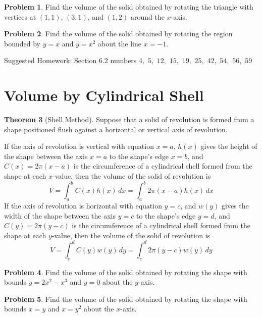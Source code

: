 \documentclass[letterpaper, twoside, 12pt]{book}
\theoremstyle{definition}
\newtheorem{theorem}{Theorem}
\theoremstyle{definition}
\newtheorem{problem}[theorem]{Problem}
\begin{document}
\begin{problem}
 Find the volume of the solid obtained by rotating the triangle with
 vertices at $(1,1)$, $(3,1)$, and $(1,2)$ around the $x$-axis.
\end{problem}

\vfill

\begin{problem}
 Find the volume of the solid obtained by rotating the region bounded by
 $y=x$ and $y=x^2$ about the line $x = -1$.
\end{problem}

\vfill

\noindent Suggested Homework: Section $6.2$ numbers $4,$ $5,$ $12,$ $15,$ $19,$ $25,$ $42,$ $54,$ $56,$ $59$
\newpage

\section{Volume by Cylindrical Shell}

\begin{theorem}[Shell Method]
  Suppose that a solid of revolution is formed from a shape positioned flush
  against a horizontal or vertical axis of revolution.

  If the axis of revolution is vertical with equation $x=a$, $h(x)$ gives
  the height of the shape between the axis $x=a$ to the shape's edge $x=b$,
  and $C(x)=2\pi(x-a)$ is the circumference of a cylindrical shell formed from
  the shape at each $x$-value,
  then the volume of the solid of revolution is
  \[
    V = \int_a^b C(x)h(x)\, dx = \int_a^b 2\pi(x-a)h(x)\, dx
  \]
  If the axis of revolution is horizontal with equation $y=c$, and $w(y)$ gives
  the width of the shape between the axis $y=c$ to the shape's edge $y=d$,
  and $C(y)=2\pi(y-c)$ is the circumference of a cylindrical shell formed from
  the shape at each $y$-value,
  then the volume of the solid of revolution is
  \[
    V = \int_c^d C(y)w(y)\, dy = \int_c^d 2\pi(y-c)w(y)\, dy
  \]
\end{theorem}

\begin{problem}
 Find the volume of the solid obtained by rotating the shape with bounds
 $y = 2x^2-x^3$ and $y = 0$ about the $y$-axis.
\end{problem}

\vfill

\begin{problem}
 Find the volume of the solid obtained by rotating the shape with bounds
 $x = y$ and $x = y^2$ about the $x$-axis.
\end{problem}
\end{document}
